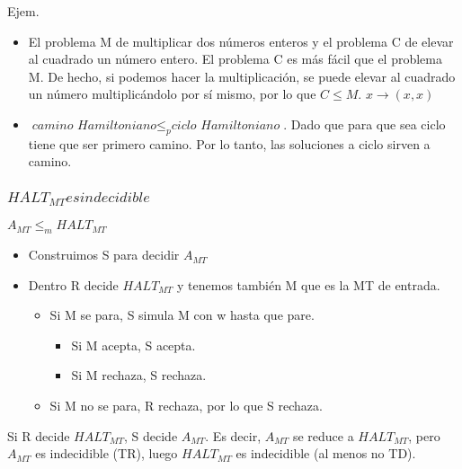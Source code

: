 Ejem. 
\begin{itemize}
    \item El problema M de multiplicar dos números enteros y el problema C de elevar al cuadrado un número entero. El problema C es más fácil que el problema M. De hecho, si podemos hacer la multiplicación, se puede elevar al cuadrado un número multiplicándolo por sí mismo, por lo que $C \leq M$. $x \rightarrow (x,x)$
    \item $\textit{camino Hamiltoniano} \leq_p \textit{ciclo Hamiltoniano}$. Dado que para que sea ciclo tiene que ser primero camino. Por lo tanto, las soluciones a ciclo sirven a camino.
\end{itemize} 

\subsubsection{$HALT_{MT} es indecidible$}
$A_{MT} \leq_m HALT_{MT}$
\begin{itemize}
    \item Construimos S para decidir $A_{MT}$
    \item Dentro R decide $HALT_{MT}$ y tenemos también M que es la MT de entrada. 
    \begin{itemize}
        \item Si M se para, S simula M con w hasta que pare.
        \begin{itemize}
            \item Si M acepta, S acepta.
            \item Si M rechaza, S rechaza.
        \end{itemize}
        \item Si M no se para, R rechaza, por lo que S rechaza.
    \end{itemize}  
\end{itemize}

Si R decide $HALT_{MT}$, S decide $A_{MT}$. Es decir, $A_{MT}$ se reduce a $HALT_{MT}$, pero $A_{MT}$ es indecidible (TR), luego $HALT_{MT}$ es indecidible (al menos no TD).